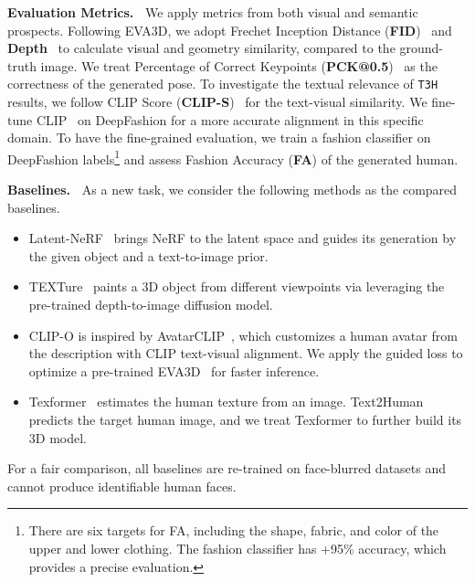 \documentclass[11pt]{article}
\begin{document}
\vspace{1ex} \noindent \textbf{Evaluation Metrics.~}
We apply metrics from both visual and semantic prospects. Following EVA3D, we adopt Frechet Inception Distance (\textbf{FID})~\cite{heusel2017fid} and \textbf{Depth}~\cite{ranftl2020depth} to calculate visual and geometry similarity, compared to the ground-truth image. We treat Percentage of Correct Keypoints (\textbf{PCK@0.5})~\cite{andriluka2014pck} as the correctness of the generated pose. To investigate the textual relevance of \texttt{T3H} results, we follow CLIP Score (\textbf{CLIP-S})~\cite{hessel2021clip-s} for the text-visual similarity. We fine-tune CLIP~\cite{radford2021clip} on DeepFashion for a more accurate alignment in this specific domain. To have the fine-grained evaluation, we train a fashion classifier on DeepFashion labels\footnote{There are six targets for FA, including the shape, fabric, and color of the upper and lower clothing. The fashion classifier has +95\% accuracy, which provides a precise evaluation.} and assess Fashion Accuracy (\textbf{FA}) of the generated human.

\vspace{1ex} \noindent \textbf{Baselines.~}
As a new task, we consider the following methods as the compared baselines.
\begin{itemize}[noitemsep, leftmargin=*, topsep=1pt]
    \item Latent-NeRF~\cite{metzer2023latent-nerf} brings NeRF to the latent space and guides its generation by the given object and a text-to-image prior.
    \item TEXTure~\cite{richardson2023texture} paints a 3D object from different viewpoints via leveraging the pre-trained depth-to-image diffusion model. 
    \item CLIP-O is inspired by AvatarCLIP~\cite{hong2022avatar-clip}, which customizes a human avatar from the description with CLIP text-visual alignment. We apply the guided loss to optimize a pre-trained EVA3D~\cite{hong2023eva3d} for faster inference.
    \item Texformer~\cite{xu2021texformer} estimates the human texture from an image. Text2Human~\cite{jiang2022text2human} predicts the target human image, and we treat Texformer to further build its 3D model.
\end{itemize}
For a fair comparison, all baselines are re-trained on face-blurred datasets and cannot produce identifiable human faces.
\end{document}
